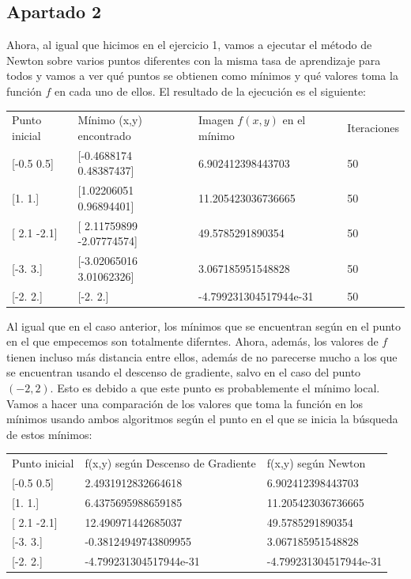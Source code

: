 \documentclass[12pt]{scrartcl}
\begin{document}
{\subsection*{Apartado 2}
Ahora, al igual que hicimos en el ejercicio 1, vamos a ejecutar el método de Newton sobre varios puntos diferentes con la misma tasa de aprendizaje para todos y vamos a ver qué puntos se obtienen como mínimos y qué valores toma la función $f$ en cada
uno de ellos. El resultado de la ejecución es el siguiente:
\begin{table}[H]
  \begin{tabular}{llll}
  Punto inicial               & Mínimo (x,y) encontrado                & Imagen $f(x,y)$ en el mínimo                & Iteraciones \\
  {[}-0.5  0.5{]} & {[}-0.4688174   0.48387437{]} & 6.902412398443703      & 50         \\
  {[}1. 1.{]}     & {[}1.02206051 0.96894401{]}   & 11.205423036736665     & 50         \\
  {[} 2.1 -2.1{]} & {[} 2.11759899 -2.07774574{]} & 49.5785291890354       & 50         \\
  {[}-3.  3.{]}   & {[}-3.02065016  3.01062326{]} & 3.067185951548828      & 50         \\
  {[}-2.  2.{]}   & {[}-2.  2.{]}                 & -4.799231304517944e-31 & 50        
  \end{tabular}
\end{table}
Al igual que en el caso anterior, los mínimos que se encuentran según en el punto en el que empecemos son totalmente diferntes. Ahora, además, los valores de $f$ tienen incluso más distancia entre ellos, además de no parecerse mucho a los que se encuentran usando
el descenso de gradiente, salvo en el caso del punto $(-2,2)$. Esto es debido a que este punto es probablemente el mínimo local. Vamos a hacer una comparación de los valores que toma la función en los mínimos usando ambos algoritmos según el punto en el que se inicia 
la búsqueda de estos mínimos:

\begin{table}[H]
  \begin{tabular}{lll}
  Punto inicial   & f(x,y) según Descenso de Gradiente & f(x,y) según Newton     \\
  {[}-0.5  0.5{]} & 2.4931912832664618                 & 6.902412398443703                        \\
  {[}1. 1.{]}     & 6.4375695988659185                 & 11.205423036736665                       \\
  {[} 2.1 -2.1{]} & 12.490971442685037                 & 49.5785291890354                         \\
  {[}-3.  3.{]}   & -0.38124949743809955               & 3.067185951548828                        \\
  {[}-2.  2.{]}   & -4.799231304517944e-31             & -4.799231304517944e-31                   
  \end{tabular}
  \end{table}

}
\end{document}

